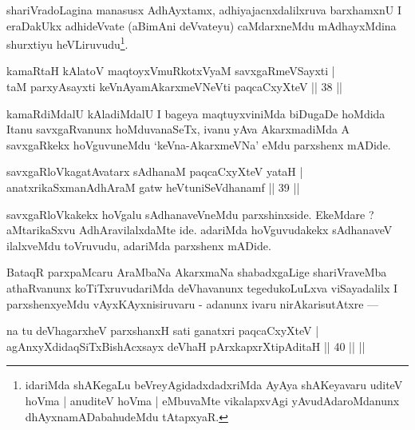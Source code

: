 \begin{artha}
shariVradoLagina manasusx AdhAyxtamx, adhiyajacnxdalilxruva barxhamxnU I eraDakUkx adhideVvate (aBimAni deVvateyu) caMdarxneMdu mAdhayxMdina shurxtiyu heVLiruvudu\footnote[1]{idariMda shAKegaLu beVreyAgidadxdadxriMda AyAya shAKeyavaru uditeV hoVma | anuditeV hoVma | eMbuvaMte vikalapxvAgi yAvudAdaroMdanunx dhAyxnamADabahudeMdu tAtapxyaR.}.
\end{artha}

\begin{shl}
kamaRtaH kAlatoV maqtoyxVmuRkotxV\s yaM savxgaRmeVSayxti |\\
taM parxyAsayxti keVnAyamAkarxmeVNeVti paqcaCxyXteV \hfill || 38 ||
\end{shl}

\begin{artha}
kamaRdiMdalU kAladiMdalU I bageya maqtuyxviniMda biDugaDe hoMdida Itanu savxgaRvanunx hoMduvanaSeTx, ivanu yAva AkarxmadiMda A savxgaRkekx hoVguvuneMdu `keVna-AkarxmeVNa' eMdu parxshenx mADide.
\end{artha}


\begin{shl}
savxgaRloVkagatAvatarx sAdhanaM paqcaCxyXteV yataH |\\
anatxrikaSxmanAdhAraM gatw heVtuniSeVdhanamf \hfill || 39 ||
\end{shl}

\begin{artha}
savxgaRloVkakekx hoVgalu sAdhanaveVneMdu parxshinxside. EkeMdare ? aMtarikaSxvu AdhAravilalxdaMte ide. adariMda hoVguvudakekx sAdhanaveV ilalxveMdu toVruvudu, adariMda parxshenx mADide.
\end{artha}

\begin{artha}
BataqR parxpaMcaru AraMbaNa AkarxmaNa shabadxgaLige shariVraveMba athaRvanunx koTiTxruvudariMda deVhavanunx tegedukoLuLxva viSayadalilx I parxshenxyeMdu vAyxKAyxnisiruvaru - adanunx ivaru nirAkarisutAtxre ---
\end{artha}


\begin{shl}
na tu deVhagarxheV parxshanxH sati ganatxri paqcaCxyXteV |\\
agAnxyXdidaqSiTxBishAcxsayx deVhaH pArxkapxrXtipAditaH \hfill || 40 \hfill || ||
\end{shl}

